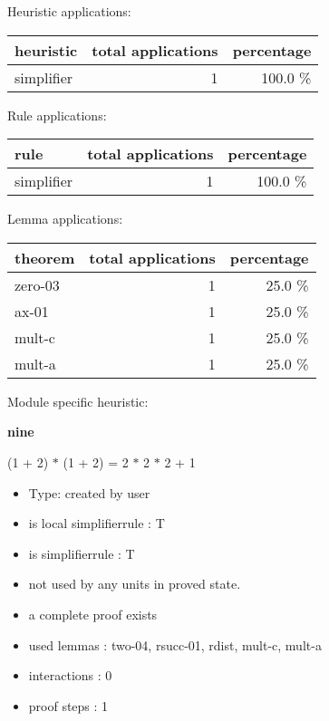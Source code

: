 \documentclass[a4paper]{article}
\begin{document}
\medskip


Heuristic applications:

\begin{supertabular}{l|r|r}
heuristic	& total applications & percentage \\ \hline
simplifier & 1 & 100.0 \% \\

\end{supertabular}

Rule applications:

\begin{supertabular}{l|r|r}
rule	        & total applications & percentage \\ \hline
simplifier & 1 & 100.0 \% \\

\end{supertabular}

Lemma applications:

\begin{supertabular}{l|r|r}
theorem	        & total applications & percentage \\ \hline
zero-03 & 1 & 25.0 \% \\
ax-01 & 1 & 25.0 \% \\
mult-c & 1 & 25.0 \% \\
mult-a & 1 & 25.0 \% \\

\end{supertabular}

Module specific heuristic:

\pagebreak

{\LARGE\bf nine}\label{lemma-nine}

\medskip

 \Fol (1 + 2) $*$ (1 + 2) = 2 $*$ 2 $*$ 2 + 1

\begin{itemize}

\item Type: created by user

\item is local simplifierrule : T
\item is simplifierrule : T
\item not used by any units in proved state.
\item       a complete proof exists
\item       used lemmas  : two-04, rsucc-01, rdist, mult-c, mult-a
\item       interactions : 0
\item       proof steps  : 1
\end{itemize}
\end{document}
